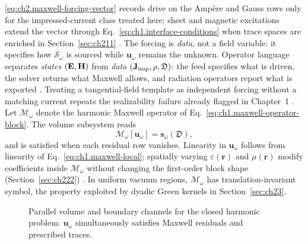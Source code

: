 \eqref{eq:ch2.maxwell-forcing-vector} records drive on the Amp\`ere and Gauss rows
only for the impressed-current class treated here; sheet and magnetic excitations
extend the vector through Eq.~\eqref{eq:ch1.interface-conditions} when trace spaces
are enriched in Section~\ref{sec:ch211} \cite{stratton1941}. The forcing is \emph{data}, not a
field variable: it specifies how \(\mathcal{S}_\omega\) is sourced while
\(\mathbf{u}_\omega\) remains the unknown. Operator language separates \emph{states}
\((\mathbf{E},\mathbf{H})\) from \emph{data} \((\mathbf{J}_{\mathrm{imp}},\rho,\mathfrak{D})\): the feed specifies what is
driven, the solver returns what Maxwell allows, and radiation operators report what is
exported \cite{maxwell1873}. Treating a tangential-field template as independent forcing
without a matching current repeats the realizability failure already flagged in
Chapter~1 \cite{stratton1941}.
Let \(\mathcal{M}_\omega\) denote the harmonic Maxwell operator of
Eq.~\eqref{eq:ch1.maxwell-operator-block}. The volume subsystem reads
\begin{equation}
\label{eq:ch2.maxwell-driven-operator}
\mathcal{M}_\omega[\mathbf{u}_\omega]=\mathbf{s}_\omega(\mathfrak{D}),
\end{equation}
and is satisfied when each residual row vanishes. Linearity in \(\mathbf{u}_\omega\)
follows from linearity of Eq.~\eqref{eq:ch1.maxwell-local}; spatially varying
\(\varepsilon(\mathbf{r})\) and \(\mu(\mathbf{r})\) modify coefficients inside
\(\mathcal{M}_\omega\) without changing the first-order block shape
(Section~\ref{sec:ch222}) \cite{stratton1941}. In uniform vacuum regions,
\(\mathcal{M}_\omega\) has translation-invariant symbol, the property exploited by
dyadic Green kernels in Section~\ref{sec:ch23}.
\begin{figure}[t]
\centering
{}
\caption{Parallel volume and boundary channels for the closed harmonic problem:
\(\mathbf{u}_\omega\) simultaneously satisfies Maxwell residuals and prescribed
traces.}
\label{fig:ch2.maxwell-boundary-stack}
\end{figure}
